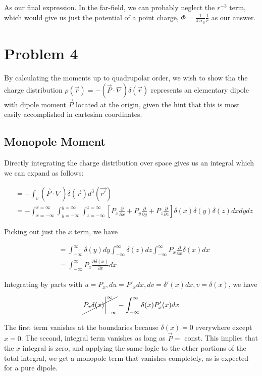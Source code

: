 \documentclass[paper=a4, fontsize=11pt]{scrartcl} %
\newcommand{\partd}[2]{\frac{\partial #1}{\partial #2}}
\newcommand{\kay}{\frac{1}{4 \pi \epsilon_0}}
\numberwithin{equation}{section} %
\numberwithin{figure}{section} %
\numberwithin{table}{section} %
\begin{document}
As our final expression. In the far-field, we can probably neglect the $r^{-3}$ term, which would give us just the potential of a point charge, $\Phi = \kay \frac{1}{r}$ as our answer.

\section{Problem 4}
By calculating the moments up to quadrupolar order, we wish to show tha the charge distribution $\rho(\vec{r}) = -(\vec{P}\cdot \nabla)\delta(\vec{r})$ represents an elementary dipole with dipole moment $\vec{P}$ located at the origin, given the hint that this is most easily accomplished in cartesian coordinates.

\subsection{Monopole Moment}

Directly integrating the charge distribution over space gives us an integral which we can expand as follows:

\begin{align}
&= - \int_v (\vec{P}\cdot \nabla)\delta(\vec{r})d^3(\vec{r'}) \\
&= -\int_{x=-\infty}^{x=\infty} \int_{y=-\infty}^{y=\infty} \int_{z=-\infty}^{z=\infty}\left[P_x \partd{}{x} + P_y \partd{}{y} + P_z \partd{}{z}\right] \delta (x) \delta (y) \delta (z) dx dy dz
\end{align}

Picking out just the $x$ term, we have

\begin{align}
&= \int_{-\infty}^{\infty}\delta(y)dy\int_{-\infty}^{\infty}\delta(z)dz \int_{-\infty}^{\infty}P_x\partd{}{x}\delta(x)dx  \\
&= \int_{-\infty}^{\infty}P_x\partd{\delta(x)}{x}dx
\end{align}

Integrating by parts with $u = P_x, du = P'_x dx, dv = \delta'(x)dx, v=\delta(x)$, we have

\begin{align}
\cancel{P_x \delta(x)\bigg|_{-\infty}^{\infty}} - \int_{-\infty}^{\infty}\delta(x)P'_x(x)dx
\end{align}

The first term vanishes at the boundaries because $\delta(x) = 0$ everywhere except $x=0$. The second, integral term vanishes as long as $\vec{P} = $ const. This implies that the $x$ integral is zero, and applying the same logic to the other portions of the total integral, we get a monopole term that vanishes completely, as is expected for a pure dipole.
\end{document}
